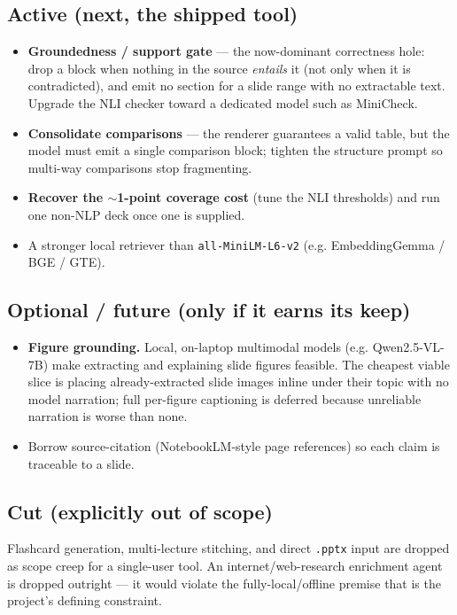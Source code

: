 \documentclass[11pt,a4paper]{article}
\begin{document}
\subsection*{Active (next, the shipped tool)}
\begin{itemize}
\item \textbf{Groundedness / support gate} --- the now-dominant correctness hole: drop a block when nothing
  in the source \emph{entails} it (not only when it is contradicted), and emit no section for a slide range
  with no extractable text. Upgrade the NLI checker toward a dedicated model such as MiniCheck.
\item \textbf{Consolidate comparisons} --- the renderer guarantees a valid table, but the model must emit a
  single comparison block; tighten the structure prompt so multi-way comparisons stop fragmenting.
\item \textbf{Recover the $\sim$1-point coverage cost} (tune the NLI thresholds) and run one non-NLP deck once
  one is supplied.
\item A stronger local retriever than \texttt{all-MiniLM-L6-v2} (e.g. EmbeddingGemma / BGE / GTE).
\end{itemize}

\subsection*{Optional / future (only if it earns its keep)}
\begin{itemize}
\item \textbf{Figure grounding.} Local, on-laptop multimodal models (e.g. Qwen2.5-VL-7B) make extracting and
  explaining slide figures feasible. The cheapest viable slice is placing already-extracted slide images
  inline under their topic with no model narration; full per-figure captioning is deferred because unreliable
  narration is worse than none.
\item Borrow source-citation (NotebookLM-style page references) so each claim is traceable to a slide.
\end{itemize}

\subsection*{Cut (explicitly out of scope)}
Flashcard generation, multi-lecture stitching, and direct \texttt{.pptx} input are dropped as scope creep
for a single-user tool. An internet/web-research enrichment agent is dropped outright --- it would violate
the fully-local/offline premise that is the project's defining constraint.
\end{document}
